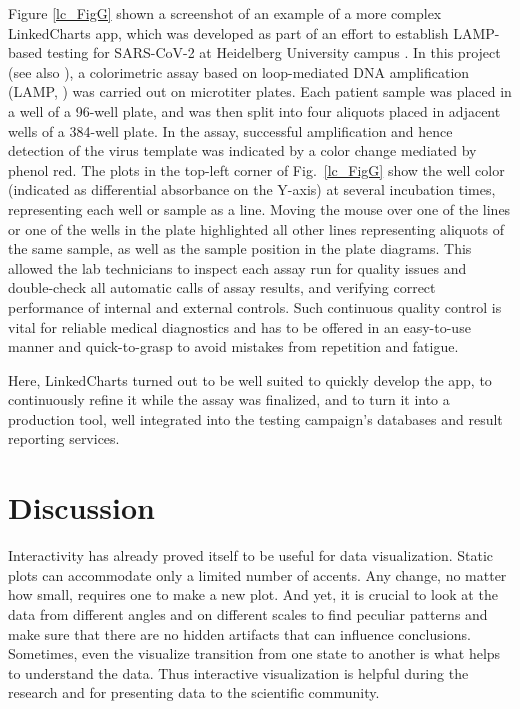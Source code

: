 \documentclass[twocolumn,10pt]{article}
\begin{document}
Figure \ref{lc_FigG} shown a screenshot of an example of a more complex LinkedCharts app, which was developed as part of an effort to establish LAMP-based testing for SARS-CoV-2 at Heidelberg University campus \citep{daothi_2020}. In this project (see also \citep{herbst_2021}), a colorimetric assay based on loop-mediated DNA amplification (LAMP, \citep{notomi_2000}) was carried out on microtiter plates. Each patient sample was placed in a well of a 96-well plate, and was then split into four aliquots placed in adjacent wells of a 384-well plate. In the assay, successful amplification  and hence detection of the virus template was indicated by a color change mediated by phenol red. The plots in the top-left corner of Fig.\ \ref{lc_FigG} show the well color (indicated as differential absorbance on the Y-axis) at several incubation times, representing each well or sample as a line. Moving the mouse over one of the lines or one of the wells in the plate highlighted all other lines representing aliquots of the same sample, as well as the sample position in the plate diagrams. This allowed the lab technicians to inspect each assay run for quality issues and double-check all automatic calls of assay results, and verifying correct performance of internal and external controls. Such continuous quality control is vital for reliable medical diagnostics and has to be offered in an easy-to-use manner and quick-to-grasp to avoid mistakes from repetition and fatigue.

Here, LinkedCharts turned out to be well suited to quickly develop the app, to continuously refine it while the assay was finalized, and to turn it into a production tool, well integrated into the testing campaign's databases and result reporting services.

\section{Discussion}

Interactivity has already proved itself to be useful for data visualization. Static plots can accommodate only a limited number of accents. Any change, no matter how small, requires one to make a new plot. And yet, it is crucial to look at the data from different angles and on different scales to find peculiar patterns and make sure that there are no hidden artifacts that can influence conclusions. Sometimes, even the visualize transition from one state to another is what helps to understand the data. Thus interactive visualization is helpful during the research and for presenting data to the scientific community.
\end{document}
